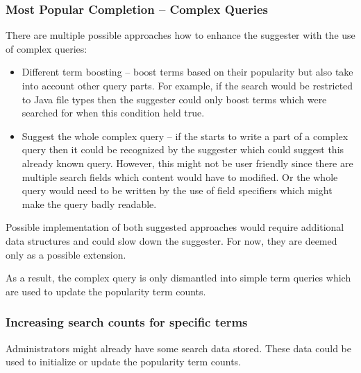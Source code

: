 \subsubsection{Most Popular Completion – Complex Queries}
\label{previous_searches}
There are multiple possible approaches how to enhance the suggester with the use of complex queries:
\begin{itemize}
    \item Different term boosting – boost terms based on their popularity but also take into account other
    query parts. For example, if the search would be restricted to Java file types then the suggester could
    only boost terms which were searched for when this condition held true.
    \item Suggest the whole complex query – if the starts to write a part of a complex query then it could be recognized
    by the suggester which could suggest this already known query. However, this might not be user friendly since there
    are multiple search fields which content would have to modified. Or the whole query would need to be written by the
    use of field specifiers which might make the query badly readable.
\end{itemize}

Possible implementation of both suggested approaches would require additional data structures and could slow down the
suggester. For now, they are deemed only as a possible extension.

As a result, the complex query is only dismantled into simple term queries which are used to update the popularity term counts.

\subsubsection{Increasing search counts for specific terms}
Administrators might already have some search data stored. These data could be used to initialize or update the
popularity term counts.

